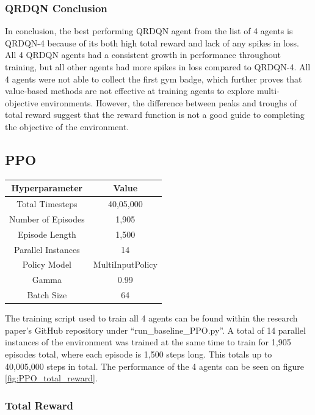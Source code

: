 \subsubsection{QRDQN Conclusion}

In conclusion, the best performing QRDQN agent from the list of 4 agents is QRDQN-4 because of its both high total reward and lack of any spikes in loss. All 4 QRDQN agents had a consistent growth in performance throughout training, but all other agents had more spikes in loss compared to QRDQN-4. All 4 agents were not able to collect the first gym badge, which further proves that value-based methods are not effective at training agents to explore multi-objective environments. However, the difference between peaks and troughs of total reward suggest that the reward function is not a good guide to completing the objective of the environment.

\subsection{PPO}

\begin{center}
    \begin{tabular}{ |c|c| } 
     \hline
     Hyperparameter & Value \\ 
     \hline
     Total Timesteps & 40,05,000 \\
     Number of Episodes &  1,905 \\
     Episode Length & 1,500 \\ 
     Parallel Instances & 14 \\
     Policy Model & MultiInputPolicy \\
     Gamma & 0.99 \\  
     Batch Size & 64 \\
     \hline
    \end{tabular}
    \end{center}

The training script used to train all 4 agents can be found within the research paper's GitHub repository under ``run\_baseline\_PPO.py''. A total of 14 parallel instances of the environment was trained at the same time to train for 1,905 episodes total, where each episode is 1,500 steps long. This totals up to 40,005,000 steps in total. The performance of the 4 agents can be seen on figure \ref{fig:PPO_total_reward}. 

\subsubsection{Total Reward}

